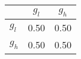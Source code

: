 \begin{tiny}\begin{tabular}{|l|c|c|}
\hline
&\textbf{$g_l$}&\textbf{$g_h$}\\\hline
\textbf{$g_l$}&0.50&0.50\\\hline
\textbf{$g_h$}&0.50&0.50\\\hline
\end{tabular}
\end{tiny}